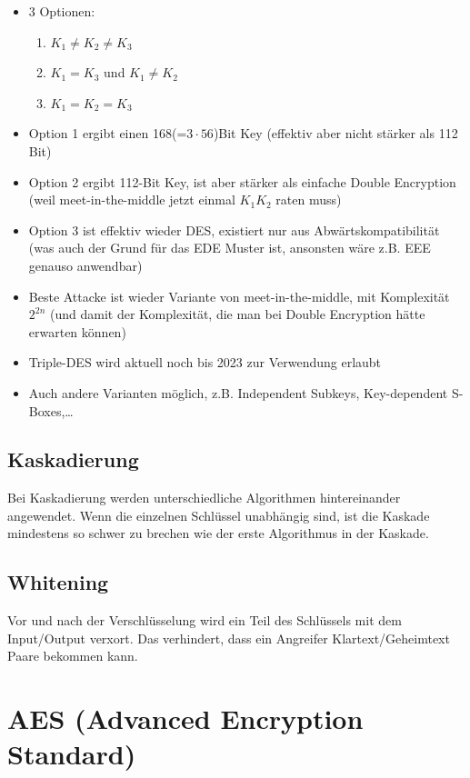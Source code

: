 \begin{itemize}
    \item 3 Optionen:
    \begin{enumerate}
        \item $K_1 \neq K_2 \neq K_3$
        \item $K_1 = K_3$ und $K_1 \neq K_2$
        \item $K_1 = K_2 = K_3$
    \end{enumerate}
    \item Option 1 ergibt einen 168(=$3\cdot 56$)Bit Key (effektiv aber nicht stärker als 112 Bit)
    \item Option 2 ergibt 112-Bit Key, ist aber stärker als einfache Double Encryption (weil meet-in-the-middle jetzt einmal $K_1K_2$ raten muss)
    \item Option 3 ist effektiv wieder DES, existiert nur aus Abwärtskompatibilität (was auch der Grund für das EDE Muster ist, ansonsten wäre z.B. EEE genauso anwendbar)
    \item Beste Attacke ist wieder Variante von meet-in-the-middle, mit Komplexität $2^{2n}$ 
    (und damit der Komplexität, die man bei Double Encryption hätte erwarten 
    können)
    \item Triple-DES wird aktuell noch bis 2023 zur Verwendung erlaubt
    \item Auch andere Varianten möglich, z.B. Independent Subkeys, Key-dependent S-Boxes,\ldots
\end{itemize}

\subsection{Kaskadierung}

Bei Kaskadierung werden unterschiedliche Algorithmen hintereinander angewendet. Wenn die einzelnen Schlüssel unabhängig sind, ist die Kaskade mindestens so schwer zu 
brechen wie der erste Algorithmus in der Kaskade.

\subsection{Whitening}

Vor und nach der Verschlüsselung wird ein Teil des Schlüssels mit dem Input/Output verxort. Das verhindert, dass ein Angreifer Klartext/Geheimtext Paare bekommen kann.

\section{AES (Advanced Encryption Standard)}

